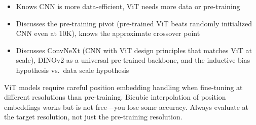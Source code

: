 \begin{interviewq}

\goodgreat
\begin{itemize}
    \item {} Knows CNN is more data-efficient, ViT needs more data or pre-training
    \item {} Discusses the pre-training pivot (pre-trained ViT beats randomly initialized CNN even at 10K), knows the approximate crossover point
    \item {} Discusses ConvNeXt (CNN with ViT design principles that matches ViT at scale), DINOv2 as a universal pre-trained backbone, and the inductive bias hypothesis vs.\ data scale hypothesis
\end{itemize}

\end{interviewq}

\begin{warningbox}
ViT models require careful position embedding handling when fine-tuning at different resolutions than pre-training. Bicubic interpolation of position embeddings works but is not free---you lose some accuracy. Always evaluate at the target resolution, not just the pre-training resolution.
\end{warningbox}

